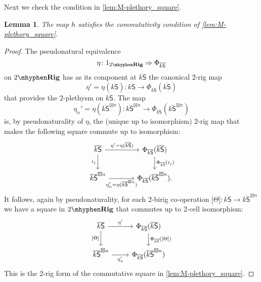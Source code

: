 \documentclass[12pt,reqno]{amsart}
\theoremstyle{plain}
\newtheorem{lem}[thm]{Lemma}
\theoremstyle{definition}
\theoremstyle{remark}
\newcommand{\maps}{\colon}
\newcommand{\To}{\Rightarrow}
\newcommand{\category}[1]{\mathsf{#1}}
\renewcommand{\S}{\category S}
\newcommand{\TRig}{2\mhyphen\namedbicat{Rig}}
\newcommand{\namedbicat}[1]{\mathbf{#1}}
\newcommand{\ksbar}{\overline{k\S}}
\numberwithin{thm}{section}
\begin{document}
Next we check the condition in \cref{lem:M-plethory_square}.

\begin{lem}
\label{lem:condition-one}
    The map $h$ satisfies the commutativity condition of \cref{lem:M-plethory_square}.
\end{lem}

\begin{proof}
    The pseudonatural equivalence 
    \[
    \eta\maps 1_{\TRig} \To \Phi_{\ksbar}
    \]
    on $\TRig$ has as its component at $\ksbar$ the canonical 2-rig map 
    \[
    \eta' = \eta(\ksbar) \maps \ksbar \to \Phi_{\ksbar}(\ksbar) 
    \]
    that provides the 2-plethysm on $\ksbar$. The map 
    \[
    \eta_n' = \eta(\ksbar^{\boxtimes n}) \maps \ksbar^{\boxtimes n} \to \Phi_{\ksbar}(\ksbar^{\boxtimes n})
    \]
    is, by pseudonaturality of $\eta$, the (unique up to isomorphism) 2-rig map that makes the following square commute up to isomorphism:
    \[
    \begin{tikzcd}[column sep = large]
        \ksbar 
        \arrow[r, "\eta' = \eta(\ksbar)"] 
        \arrow[d, swap, "i_j"] 
        & 
        \Phi_{\ksbar}(\ksbar) 
        \arrow[d, "\Phi_{\ksbar}(i_j)"] 
        \\ 
        \ksbar^{\boxtimes n} 
        \arrow[r, swap, "\eta_n' = \eta(\ksbar^{\boxtimes n})"] 
        & 
        \Phi_{\ksbar}(\ksbar^{\boxtimes n}).
    \end{tikzcd}
    \]
    It follows, again by pseudonaturality, for each 2-birig co-operation $\lbrack\Theta\rbrack \maps \ksbar \to \ksbar^{\boxtimes n}$ we have a square in $\TRig$ that commutes up to 2-cell isomorphism:
    \[
    \begin{tikzcd}
        \ksbar \arrow[r, "\eta'"] \arrow[d, swap, "\lbrack\Theta\rbrack"] & \Phi_{\ksbar}(\ksbar) \arrow[d, "\Phi_{\ksbar}(\lbrack\Theta \rbrack)"] \\ \ksbar^{\boxtimes n} \arrow[r, swap, "\eta_n'"] & \Phi_{\ksbar}(\ksbar^{\boxtimes n})
    \end{tikzcd}
    \]
    This is the 2-rig form of the commutative square in \cref{lem:M-plethory_square}. 
    

\end{proof}
\end{document}
